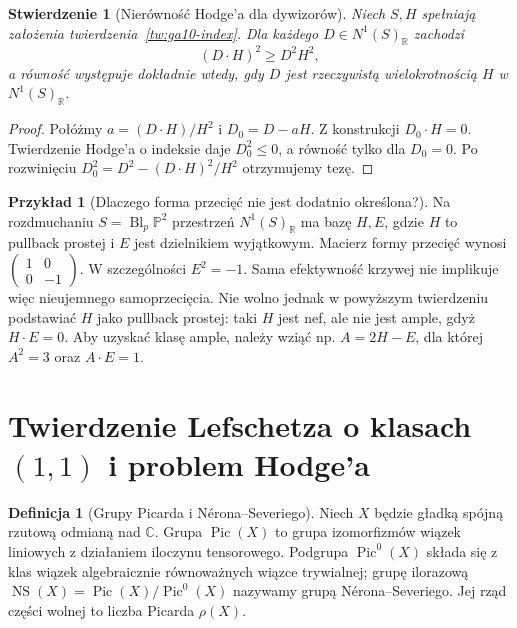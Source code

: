 \documentclass[11pt,a4paper,openany]{report}
\numberwithin{equation}{section}
\theoremstyle{plain}
\newtheorem{stwierdzenie}[twierdzenie]{Stwierdzenie}
\theoremstyle{definition}
\newtheorem{definicja}[twierdzenie]{Definicja}
\newtheorem{przyklad}[twierdzenie]{Przykład}
\theoremstyle{remark}
\newcommand{\R}{\mathbb R}
\newcommand{\C}{\mathbb C}
\newcommand{\PP}{\mathbb P}
\begin{document}
\begin{stwierdzenie}[Nierówność Hodge'a dla dywizorów]
\label{st:ga10-hodge-ineq}
Niech $S,H$ spełniają założenia
twierdzenia~\ref{tw:ga10-index}. Dla każdego
$D\in N^1(S)_{\R}$ zachodzi
\[
 (D\cdot H)^2\ge D^2H^2,
\]
a równość występuje dokładnie wtedy, gdy $D$ jest
rzeczywistą wielokrotnością $H$ w $N^1(S)_{\R}$.
\end{stwierdzenie}
\begin{proof}
Połóżmy $a=(D\cdot H)/H^2$ i $D_0=D-aH$.
Z konstrukcji $D_0\cdot H=0$.
Twierdzenie Hodge'a o indeksie daje $D_0^2\le0$,
a równość tylko dla $D_0=0$. Po rozwinięciu
$D_0^2=D^2-(D\cdot H)^2/H^2$ otrzymujemy tezę.
\end{proof}

\begin{przyklad}[Dlaczego forma przecięć nie jest dodatnio określona?]
Na rozdmuchaniu $S=\operatorname{Bl}_p\PP^2$
przestrzeń $N^1(S)_{\R}$ ma bazę $H,E$,
gdzie $H$ to pullback prostej i $E$ jest dzielnikiem
wyjątkowym. Macierz formy przecięć wynosi
$\left(\begin{smallmatrix}1&0\\0&-1\end{smallmatrix}\right)$.
W szczególności $E^2=-1$. Sama efektywność krzywej
nie implikuje więc nieujemnego samoprzecięcia.
Nie wolno jednak w powyższym twierdzeniu podstawiać
$H$ jako pullback prostej: taki $H$ jest nef, ale
nie jest ample, gdyż $H\cdot E=0$.
Aby uzyskać klasę ample, należy wziąć np.
$A=2H-E$, dla której $A^2=3$ oraz $A\cdot E=1$.
\end{przyklad}

\section{Twierdzenie Lefschetza o klasach \texorpdfstring{$(1,1)$}{(1,1)} i problem Hodge'a}
\label{sec:ga10-11}

\begin{definicja}[Grupy Picarda i Nérona--Severiego]
Niech $X$ będzie gładką spójną rzutową odmianą nad $\C$.
Grupa $\operatorname{Pic}(X)$ to grupa izomorfizmów
wiązek liniowych z działaniem iloczynu tensorowego.
Podgrupa $\operatorname{Pic}^0(X)$ składa się z klas
wiązek algebraicznie równoważnych wiązce trywialnej;
grupę ilorazową
$\operatorname{NS}(X)=\operatorname{Pic}(X)/\operatorname{Pic}^0(X)$
nazywamy grupą Nérona--Severiego.
Jej rząd części wolnej to liczba Picarda $\rho(X)$.
\end{definicja}
\end{document}
